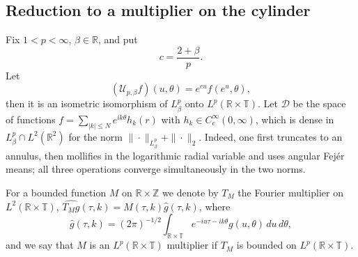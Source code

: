 \documentclass[11pt,a4paper,reqno,backref=page]{amsart}
\newcommand{\R}{\mathbb R}
\newcommand{\Z}{\mathbb Z}
\newcommand{\T}{\mathbb T}
\newcommand{\dd}{\,d}
\numberwithin{equation}{section}
\theoremstyle{definition}
\theoremstyle{remark}
\begin{document}
\subsection{Reduction to a multiplier on the cylinder}
Fix $1<p<\infty$, $\beta\in\R$, and put
\begin{equation}\label{eq:c-weight}
  c=\frac{2+\beta}{p}.
\end{equation}
Let
\begin{equation}\label{eq:fulliso}
  (\mathcal U_{p,\beta}f)(u,\theta)=e^{cu}f(e^u,\theta),
\end{equation}
then it is an isometric isomorphism of $L^p_\beta$ onto $L^p(\R\times\T)$.
Let $\mathcal D$ be the space of functions $f=\sum_{|k|\le
N}e^{ik\theta}h_k(r)$ with $h_k\in C_c^\infty(0,\infty)$, which
is dense in $L^p_\beta\cap L^2(\R^2)$ for the norm
$\|\cdot\|_{L^p_\beta}+\|\cdot\|_2$. Indeed, one first truncates
to an annulus, then mollifies in the logarithmic radial variable
and uses angular Fej\'er means; all three operations converge
simultaneously in the two norms. 

For a bounded function $M$ on
$\R\times\Z$ we denote by $T_M$ the Fourier multiplier on
$L^2(\R\times\T)$, $\widehat{T_Mg}(\tau,k)=M(\tau,k)\widehat
g(\tau,k)$, where
\begin{equation*}
  \widehat g(\tau,k)=(2\pi)^{-1/2}
  \int_{\R\times\T}e^{-iu\tau-ik\theta}g(u,\theta)\dd
  u\dd\theta,
\end{equation*}
and we say that $M$ is an $L^p(\R\times\T)$ multiplier if $T_M$
is bounded on $L^p(\R\times\T)$.
\end{document}

